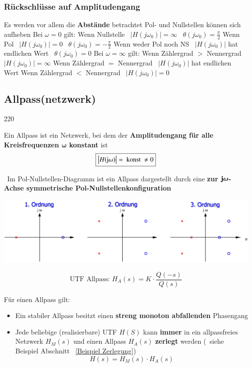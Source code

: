 \subsubsection{Rückschlüsse auf Amplitudengang}

\begin{outline}
    \1 Es werden vor allem die \textbf{Abstände} betrachtet 
    \1 Pol- und Nullstellen können sich aufheben
    \1 Bei $\omega = 0$ gilt:
        \2 Wenn Nullstelle \textrightarrow\ $|H(j \omega_0)| = \infty$ \textrightarrow\ $\theta(j \omega_0) = \frac{\pi}{2}$
        \2 Wenn Pol \textrightarrow\ $|H(j \omega_0)| = 0$ \textrightarrow\ $\theta(j \omega_0) = -\frac{\pi}{2}$
        \2 Wenn weder Pol noch NS \textrightarrow\ $|H(j \omega_0)|$ hat endlichen Wert \textrightarrow\ $\theta(j \omega_0) = 0$
    \1 Bei $\omega = \infty$ gilt:
        \2 Wenn Zählergrad $>$ Nennergrad \textrightarrow\ $|H(j \omega_0)| = \infty$
        \2 Wenn Zählergrad $=$ Nennergrad \textrightarrow\ $|H(j \omega_0)|$ hat endlichen Wert
        \2 Wenn Zählergrad $<$ Nennergrad \textrightarrow\ $|H(j \omega_0)| = 0$
\end{outline}


\subsection{Allpass(netzwerk)}{220}

Ein Allpass ist ein Netzwerk, bei dem der \textbf{Amplitudengang für alle Kreisfrequenzen $\bm{\omega}$ konstant} ist
$$ \boxed{\left|H(\mathrm{j} \omega)\right| = \text{ konst } \neq 0}$$

\textrightarrow\ Im Pol-Nullstellen-Diagramm ist ein Allpass dargestellt durch eine 
\textbf{zur $\bm{\mathrm{j} \omega}$-Achse symmetrische Pol-Nullstellenkonfiguration}

\includegraphics[width=\columnwidth]{images/allpass.png}

$$ \boxed{ \text{UTF Allpass: } H_A(s) = K \cdot \frac{Q(-s)}{Q(s)} } $$

Für einen Allpass gilt:
\begin{itemize}
    \item Ein stabiler Allpass besitzt einen \textbf{streng monoton abfallenden} Phasengang
    \item Jede beliebige (realisierbare) UTF $H(S)$ kann \textbf{immer} in ein allpassfreies Netzwerk $H_M(s)$ und einen Allpass $H_A(s)$
        \textbf{zerlegt} werden (\textrightarrow\ siehe Beispiel Abschnitt ~\ref{Beispiel Zerlegung})
        $$ \boxed{ H(s) = H_M(s) \cdot H_A(s) }$$
\end{itemize}


